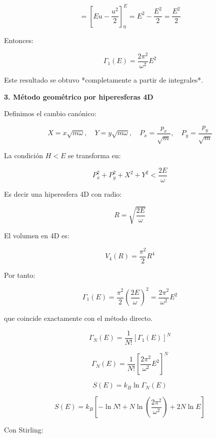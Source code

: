 \documentclass{article}
\begin{document}
\[
=
\left[E u - \frac{u^{2}}{2}\right]_{0}^{E}
=
E^{2}-\frac{E^{2}}{2}
=\frac{E^{2}}{2}
\]

Entonces:

\[
\boxed{
\Gamma_{1}(E) = \frac{2\pi^{2}}{\omega^{2}}E^{2}
}
\]

Este resultado se obtuvo *completamente a partir de integrales*.


\textcolor{Apple Green}{\textbf{3. Método geométrico por hiperesferas 4D}}

Definimos el cambio canónico:

\[
X = x\sqrt{m\omega},\quad
Y = y\sqrt{m\omega},\quad
P_{x} = \frac{p_{x}}{\sqrt{m}},\quad
P_{y} = \frac{p_{y}}{\sqrt{m}}
\]

La condición \(H<E\) se transforma en:

\[
P_{x}^{2}+P_{y}^{2}+X^{2}+Y^{2}<\frac{2E}{\omega}
\]

Es decir una hiperesfera 4D con radio:

\[
R=\sqrt{\frac{2E}{\omega}}
\]

El volumen en 4D es:

\[
V_{4}(R)=\frac{\pi^{2}}{2}R^{4}
\]

Por tanto:

\[
\Gamma_{1}(E)
=
\frac{\pi^{2}}{2}
\left(\frac{2E}{\omega}\right)^{2}
=
\frac{2\pi^{2}}{\omega^{2}}E^{2}
\]

que coincide exactamente con el método directo.


\[
\Gamma_{N}(E)
=
\frac{1}{N!}
\left[\Gamma_{1}(E)\right]^{N}
\]

\[
\boxed{
\Gamma_{N}(E)=
\frac{1}{N!}
\left[
\frac{2\pi^{2}}{\omega^{2}}E^{2}
\right]^{N}
}
\]


\[
S(E)=k_{B}\ln\Gamma_{N}(E)
\]

\[
S(E)
= k_{B}
\left[
-\ln N!
+ N\ln\left(\frac{2\pi^{2}}{\omega^{2}}\right)
+ 2N\ln E
\right]
\]

Con Stirling:
\end{document}
